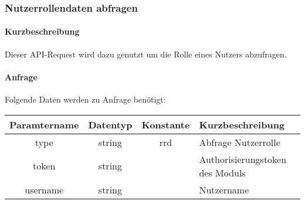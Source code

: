 \subsubsection{Nutzerrollendaten abfragen}
\paragraph{Kurzbeschreibung}Dieser API-Request wird dazu genutzt um die Rolle eines Nutzers abzufragen.
\paragraph{Anfrage}Folgende Daten werden zu Anfrage benötigt:
\begin{table}[H]
	\begin{tabular}{|c|c|c|p{6.5cm}|}
		\hline
		\textbf{Paramtername} & \textbf{Datentyp} & \textbf{Konstante} & \textbf{Kurzbeschreibung}                                                                                               \\ \hline
		type                & string            & rrd                & Abfrage Nutzerrolle \\ \hline
		token               & string            &                    & Authorisierungstoken des Moduls \\ \hline
		username            & string            &                    & Nutzername \\ \hline
	\end{tabular}
\end{table}
